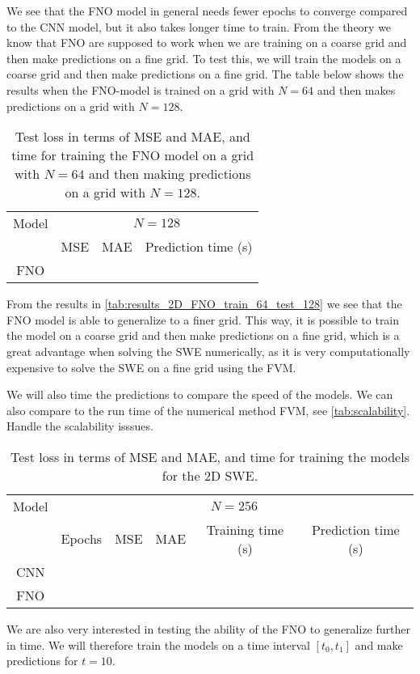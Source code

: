 We see that the FNO model in general needs fewer epochs to converge compared to the CNN model, but it also takes longer time to train.
From the theory we know that FNO are supposed to work when we are training on a coarse grid and then make predictions on a fine grid.
To test this, we will train the models on a coarse grid and then make predictions on a fine grid.
The table below shows the results when the FNO-model is trained on a grid with $N = 64$ and then makes predictions on a grid with $N = 128$.
\begin{table}[H]
    \centering
    \begin{tabular}{c|ccc}
        Model & \multicolumn{3}{c}{$N = 128$} \\
        \cline{2-4}
        & MSE & MAE & Prediction time (s) \\
        \hline
        FNO  &
         &
         &
        
    \end{tabular}
    \caption{Test loss in terms of MSE and MAE, and time for training the FNO model on a grid with $N = 64$ and then making predictions on a grid with $N = 128$.}\label{tab:results_2D_FNO_train_64_test_128}
\end{table}
From the results in \autoref{tab:results_2D_FNO_train_64_test_128} we see that the FNO model is able to generalize to a finer grid.
This way, it is possible to train the model on a coarse grid and then make predictions on a fine grid, which is a great advantage when solving the SWE numerically, as it is very computationally expensive to solve the SWE on a fine grid using the FVM.

We will also time the predictions to compare the speed of the models.
We can also compare to the run time of the numerical method FVM, see \autoref{tab:scalability}.
Handle the scalability isssues.
\begin{table}[H]
    \centering
    \small %
    \begin{tabular}{c|ccccc}
        Model & \multicolumn{5}{c}{$N = 256$} \\
        \cline{2-6}
        & Epochs & MSE & MAE & Training time (s) & Prediction time (s) \\
        \hline
        CNN & 
        & & & & \\
        \hline
        FNO &
        & & & & \\
        \hline
    \end{tabular}
    \caption{Test loss in terms of MSE and MAE, and time for training the models for the 2D SWE.}\label{tab:results_2D_comparison_256}
\end{table}

We are also very interested in testing the ability of the FNO to generalize further in time.
We will therefore train the models on a time interval $[t_0, t_1]$ and make predictions for $t = 10$.

